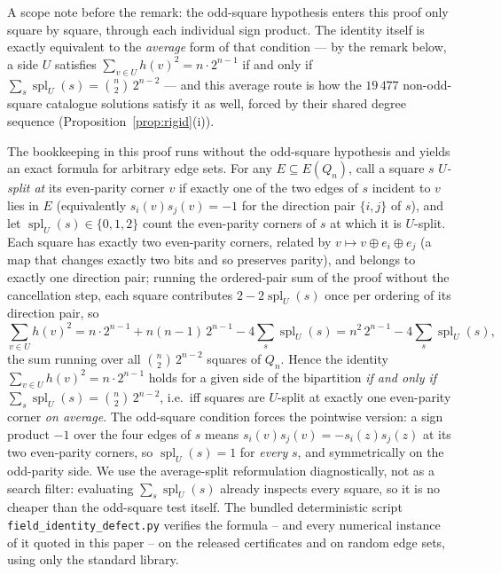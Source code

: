 \documentclass[12pt]{article}
\begin{document}
A scope note before the remark: the odd-square hypothesis enters this
proof only square by square, through each individual sign product. The
identity itself is exactly equivalent to the \emph{average} form of that
condition --- by the remark below, a side $U$ satisfies
$\sum_{v\in U}h(v)^2=n\cdot2^{n-1}$ if and only if
$\sum_s\operatorname{spl}_U(s)=\binom n2\,2^{n-2}$ --- and this average
route is how the $19\,477$ non-odd-square catalogue solutions satisfy it
as well, forced by their shared degree sequence
(Proposition~\ref{prop:rigid}(i)).

\begin{remark}\label{rem:defect}
The bookkeeping in this proof runs without the odd-square hypothesis and
yields an exact formula for arbitrary edge sets. For any $E\subseteq
E(Q_n)$, call a square $s$ \emph{$U$-split at} its even-parity corner $v$
if exactly one of the two edges of $s$ incident to $v$ lies in $E$
(equivalently $s_i(v)s_j(v)=-1$ for the direction pair $\{i,j\}$ of $s$),
and let $\operatorname{spl}_U(s)\in\{0,1,2\}$ count the even-parity
corners of $s$ at which it is $U$-split. Each square has exactly two
even-parity corners, related by $v\mapsto v\oplus e_i\oplus e_j$ (a map
that changes exactly two bits and so preserves parity), and
belongs to exactly one direction pair; running the ordered-pair sum of the
proof without the cancellation step, each square contributes
$2-2\operatorname{spl}_U(s)$ once per ordering of its direction pair, so
\[
\sum_{v\in U}h(v)^2
= n\cdot2^{n-1} + n(n-1)\,2^{n-1} - 4\sum_{s}\operatorname{spl}_U(s)
= n^2\,2^{n-1} - 4\sum_{s}\operatorname{spl}_U(s),
\]
the sum running over all $\binom n2\,2^{n-2}$ squares of $Q_n$. Hence the
identity $\sum_{v\in U}h(v)^2=n\cdot2^{n-1}$ holds for a given side of
the bipartition \emph{if and only if}
$\sum_s\operatorname{spl}_U(s)=\binom n2\,2^{n-2}$, i.e.\ iff squares
are $U$-split at exactly one even-parity corner \emph{on average}. The
odd-square condition forces the pointwise version: a sign product $-1$
over the four edges of $s$ means $s_i(v)s_j(v)=-s_i(z)s_j(z)$ at its two
even-parity corners, so $\operatorname{spl}_U(s)=1$ for \emph{every}
$s$, and symmetrically on the odd-parity side. We use the average-split
reformulation diagnostically, not as a search filter: evaluating
$\sum_s\operatorname{spl}_U(s)$ already inspects every square, so it is
no cheaper than the odd-square test itself. The bundled deterministic
script \texttt{field\_identity\_defect.py} verifies the formula -- and
every numerical instance of it quoted in this paper -- on the released
certificates and on random edge sets, using only the standard library.
\end{remark}
\end{document}
